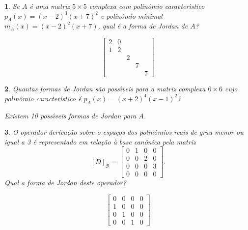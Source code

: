 \documentclass[12pt]{exam}
\newtheorem{exercicio}{}
\begin{document}
\begin{exercicio}
  Se $A$ \'e uma matriz $5 \times 5$ complexa com polin\^omio caracter{\'\i}stico $p_A(x) = (x - 2)^3(x + 7)^2$ e polin\^omio minimal $m_A(x) = (x - 2)^2(x + 7)$, qual \'e a forma de Jordan de $A$?
  \begin{solucao}
    \[
      \begin{bmatrix}
        2 & 0\\
        1 & 2\\
        & & 2\\
        & & & 7\\
        & & & & 7
      \end{bmatrix}
    \]
  \end{solucao}
\end{exercicio}

\begin{exercicio}
  Quantas formas de Jordan s\~ao poss{\'\i}veis para a matriz complexa $6 \times 6$ cujo polin\^omio caracter{\'\i}stico \'e $p_A(x) = (x + 2)^4(x - 1)^2$?
  \begin{solucao}
    Existem 10 poss{\'\i}veis formas de Jordan para $A$.
  \end{solucao}
\end{exercicio}

\begin{exercicio}
  O operador deriva\c{c}\~ao sobre o espa\c{c}os dos polin\^omios reais de grau menor ou igual a 3 \'e representado em rela\c{c}\~ao \`a base can\^onica pela matriz
  \[
      [D]_\mathcal{B} = \begin{bmatrix}
        0 & 1 & 0 & 0\\
        0 & 0 & 2 & 0\\
        0 & 0 & 0 & 3\\
        0 & 0 & 0 & 0
      \end{bmatrix}.
  \]
  Qual a forma de Jordan deste operador?
  \begin{solucao}
    \[
      \begin{bmatrix}
        0 & 0 & 0 & 0\\
        1 & 0 & 0 & 0\\
        0 & 1 & 0 & 0\\
        0 & 0 & 1 & 0
      \end{bmatrix}
    \]
  \end{solucao}
\end{exercicio}
\end{document}
